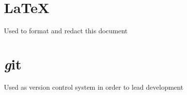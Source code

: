 \section{\LaTeX}
Used to format and redact this document
\section{\textit git}
Used as version control system in order to lead development
